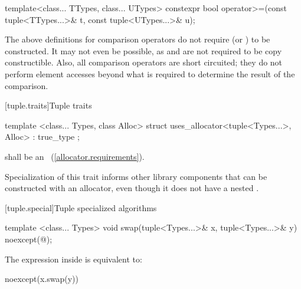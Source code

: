 %
%
\begin{itemdecl}
template<class... TTypes, class... UTypes>
  constexpr bool operator>=(const tuple<TTypes...>& t, const tuple<UTypes...>& u);
\end{itemdecl}

\begin{itemdescr}
\pnum\returns {}
\end{itemdescr}

\pnum \enternote The above definitions for comparison operators
do not require 
(or ) to be constructed. It may not
even be possible, as  and  are not required to be copy
constructible. Also, all comparison operators are short circuited;
they do not perform element accesses beyond what is required to determine the
result of the comparison. \exitnote

[tuple.traits]{Tuple traits}

\begin{itemdecl}
template <class... Types, class Alloc>
  struct uses_allocator<tuple<Types...>, Alloc> : true_type { };
\end{itemdecl}

\begin{itemdescr}
\requires {} shall be an ~(\ref{allocator.requirements}).

\pnum
\enternote Specialization of this trait informs other library components that
 can be constructed with an allocator, even though it does not have
a nested . \exitnote
\end{itemdescr}

[tuple.special]{Tuple specialized algorithms}

%
\begin{itemdecl}
template <class... Types>
  void swap(tuple<Types...>& x, tuple<Types...>& y) noexcept(@\seebelow@);
\end{itemdecl}

\begin{itemdescr}
\pnum
\remark The expression inside  is equivalent to:

\begin{codeblock}
noexcept(x.swap(y))
\end{codeblock}

\pnum
\effects {}
\end{itemdescr}

